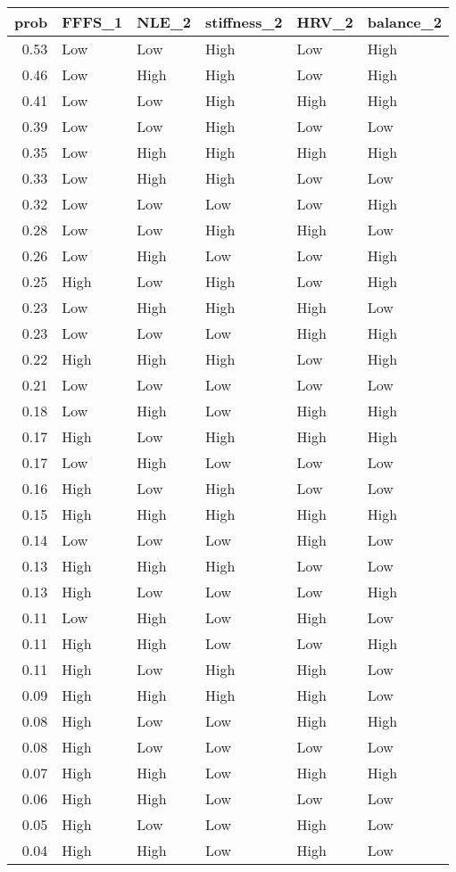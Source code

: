 \documentclass[
]{article}
\begin{document}
\begin{table}[H]

\caption{\label{tab:unnamed-chunk-7}}
\centering
\begin{tabular}[t]{r|l|l|l|l|l}
\hline
prob & FFFS\_1 & NLE\_2 & stiffness\_2 & HRV\_2 & balance\_2\\
\hline
0.53 & Low & Low & High & Low & High\\
\hline
0.46 & Low & High & High & Low & High\\
\hline
0.41 & Low & Low & High & High & High\\
\hline
0.39 & Low & Low & High & Low & Low\\
\hline
0.35 & Low & High & High & High & High\\
\hline
0.33 & Low & High & High & Low & Low\\
\hline
0.32 & Low & Low & Low & Low & High\\
\hline
0.28 & Low & Low & High & High & Low\\
\hline
0.26 & Low & High & Low & Low & High\\
\hline
0.25 & High & Low & High & Low & High\\
\hline
0.23 & Low & High & High & High & Low\\
\hline
0.23 & Low & Low & Low & High & High\\
\hline
0.22 & High & High & High & Low & High\\
\hline
0.21 & Low & Low & Low & Low & Low\\
\hline
0.18 & Low & High & Low & High & High\\
\hline
0.17 & High & Low & High & High & High\\
\hline
0.17 & Low & High & Low & Low & Low\\
\hline
0.16 & High & Low & High & Low & Low\\
\hline
0.15 & High & High & High & High & High\\
\hline
0.14 & Low & Low & Low & High & Low\\
\hline
0.13 & High & High & High & Low & Low\\
\hline
0.13 & High & Low & Low & Low & High\\
\hline
0.11 & Low & High & Low & High & Low\\
\hline
0.11 & High & High & Low & Low & High\\
\hline
0.11 & High & Low & High & High & Low\\
\hline
0.09 & High & High & High & High & Low\\
\hline
0.08 & High & Low & Low & High & High\\
\hline
0.08 & High & Low & Low & Low & Low\\
\hline
0.07 & High & High & Low & High & High\\
\hline
0.06 & High & High & Low & Low & Low\\
\hline
0.05 & High & Low & Low & High & Low\\
\hline
0.04 & High & High & Low & High & Low\\
\hline
\end{tabular}
\end{table}
\end{document}

